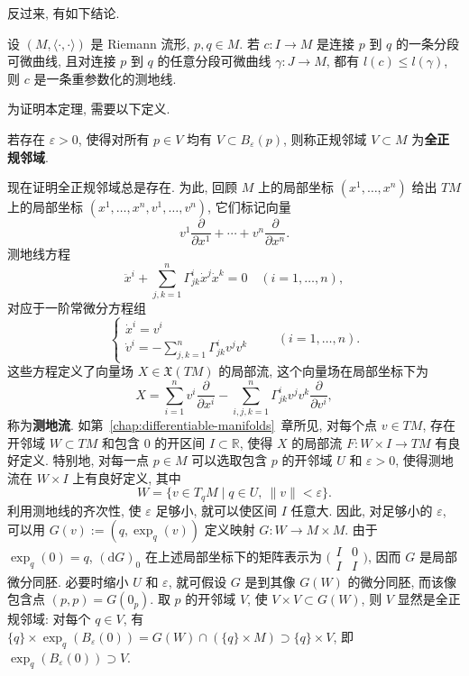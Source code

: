 反过来, 有如下结论.

\begin{RiemannTheorem}\label{thm:length-minimizer-is-geodesic}
设 $(M,\langle\cdot,\cdot\rangle)$ 是 Riemann 流形, $p,q\in M$. 若 $c:I\to M$ 是连接 $p$ 到 $q$ 的一条分段可微曲线, 且对连接 $p$ 到 $q$ 的任意分段可微曲线 $\gamma:J\to M$, 都有 $l(c)\leq l(\gamma)$, 则 $c$ 是一条重参数化的测地线.
\end{RiemannTheorem}

\begin{RiemannProof}
为证明本定理, 需要以下定义.

\begin{RiemannDefinition}\label{def:totally-normal-neighborhood}
若存在 $\varepsilon>0$, 使得对所有 $p\in V$ 均有 $V\subset B_\varepsilon(p)$, 则称正规邻域 $V\subset M$ 为\textbf{全正规邻域}.
\end{RiemannDefinition}

现在证明全正规邻域总是存在. 为此, 回顾 $M$ 上的局部坐标 $(x^1,\ldots,x^n)$ 给出 $TM$ 上的局部坐标 $(x^1,\ldots,x^n,v^1,\ldots,v^n)$, 它们标记向量
\[
  v^1\frac{\partial}{\partial x^1}+\cdots+v^n\frac{\partial}{\partial x^n}.
\]
测地线方程
\[
  \ddot x^i+\sum_{j,k=1}^n\Gamma_{jk}^i\dot x^j\dot x^k=0\quad(i=1,\ldots,n),
\]
对应于一阶常微分方程组
\[
  \begin{cases}
    \dot x^i=v^i\\
    \dot v^i=-\sum_{j,k=1}^n\Gamma_{jk}^iv^jv^k
  \end{cases}
  \qquad(i=1,\ldots,n).
\]
这些方程定义了向量场 $X\in\mathfrak{X}(TM)$ 的局部流, 这个向量场在局部坐标下为
\[
  X=\sum_{i=1}^n v^i\frac{\partial}{\partial x^i}
  -\sum_{i,j,k=1}^n\Gamma_{jk}^iv^jv^k\frac{\partial}{\partial v^i},
\]
称为\textbf{测地流}. 如第~\ref{chap:differentiable-manifolds}~章所见, 对每个点 $v\in TM$, 存在开邻域 $W\subset TM$ 和包含 0 的开区间 $I\subset\mathbb{R}$, 使得 $X$ 的局部流 $F:W\times I\to TM$ 有良好定义. 特别地, 对每一点 $p\in M$ 可以选取包含 $p$ 的开邻域 $U$ 和 $\varepsilon>0$, 使得测地流在 $W\times I$ 上有良好定义, 其中
\[
  W=\{v\in T_qM\mid q\in U,\ \lVert v\rVert<\varepsilon\}.
\]
利用测地线的齐次性, 使 $\varepsilon$ 足够小, 就可以使区间 $I$ 任意大. 因此, 对足够小的 $\varepsilon$, 可以用 $G(v):=(q,\exp_q(v))$ 定义映射 $G:W\to M\times M$. 由于 $\exp_q(0)=q$, $(\mathrm{d}G)_0$ 在上述局部坐标下的矩阵表示为 $\bigl(\begin{smallmatrix}I&0\\I&I\end{smallmatrix}\bigr)$, 因而 $G$ 是局部微分同胚. 必要时缩小 $U$ 和 $\varepsilon$, 就可假设 $G$ 是到其像 $G(W)$ 的微分同胚, 而该像包含点 $(p,p)=G(0_p)$. 取 $p$ 的开邻域 $V$, 使 $V\times V\subset G(W)$, 则 $V$ 显然是全正规邻域: 对每个 $q\in V$, 有 $\{q\}\times\exp_q(B_\varepsilon(0))=G(W)\cap(\{q\}\times M)\supset\{q\}\times V$, 即 $\exp_q(B_\varepsilon(0))\supset V$.


\end{RiemannProof}
